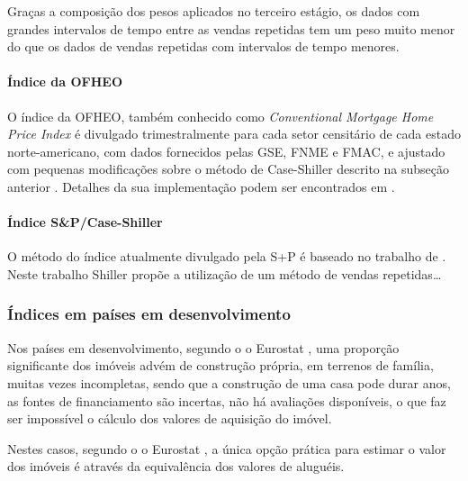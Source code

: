\documentclass[
	12pt,				%
	oneside,			%
	a4paper,			%
	chapter=TITLE,		%
	section=TITLE,		%
	english,			%
	brazil				%
	]{abntex2}
\begin{document}
\begin{refsection}
Graças a composição dos pesos aplicados no terceiro estágio, os dados com
grandes intervalos de tempo entre as vendas repetidas tem um peso muito menor
do que os dados de vendas repetidas com intervalos de tempo menores.

\hypertarget{uxedndice-da}{%
\paragraph{\texorpdfstring{Índice da \gls{OFHEO}}{Índice da }}\label{uxedndice-da}}

O índice da \gls{OFHEO}, também conhecido como
\emph{Conventional Mortgage Home Price Index} é divulgado trimestralmente para cada
setor censitário de cada estado norte-americano, com dados fornecidos pelas
\gls{GSE}, \gls{FNME} e \gls{FMAC}, e ajustado com pequenas modificações
sobre o método de Case-Shiller descrito na subseção anterior \autocite{nagaraja2014}.
Detalhes da sua implementação podem ser encontrados em \textcite{nagaraja2011}.

\hypertarget{uxedndice-spcase-shiller}{%
\paragraph{Índice S\&P/Case-Shiller}\label{uxedndice-spcase-shiller}}

O método do índice atualmente divulgado pela \gls{S+P} é baseado no trabalho
de \textcite{Shiller1991}. Neste trabalho Shiller propõe a utilização de um método de
vendas repetidas\ldots{}

\hypertarget{uxedndices-em-pauxedses-em-desenvolvimento}{%
\subsubsection{Índices em países em desenvolvimento}\label{uxedndices-em-pauxedses-em-desenvolvimento}}

Nos países em desenvolvimento, segundo o o Eurostat \autocite*[110]{rppi}, uma proporção
significante dos imóveis advém de construção própria, em terrenos de família,
muitas vezes incompletas, sendo que a construção de uma casa pode durar anos, as
fontes de financiamento são incertas, não há avaliações disponíveis, o que faz
ser impossível o cálculo dos valores de aquisição do imóvel.

Nestes casos, segundo o o Eurostat \autocite*[110]{rppi}, a única opção prática para
estimar o valor dos imóveis é através da equivalência dos valores de aluguéis.


\end{refsection}
\end{document}
